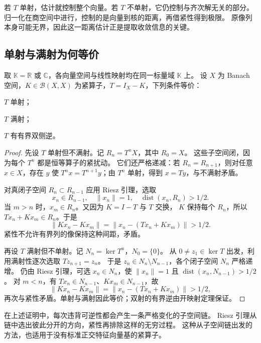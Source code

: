 若 \(T\) 单射，估计就控制整个向量。若 \(T\) 不单射，它仍控制与齐次解无关的部分。
归一化在商空间中进行，控制的是向量到核的距离，再借紧性得到极限。
原像列本身可能无界，因此这一距离估计正是提取收敛信息的关键。

\subsection{单射与满射为何等价}
\label{b1:subsec:C10402}

\begin{theorem}\label{b1:thm:C1-fredholm-bijective}
取 \(\mathbb K=\mathbb R\) 或 \(\mathbb C\)，各向量空间与线性映射均在同一标量域 \(\mathbb K\) 上。
设 \(X\) 为 Banach 空间，\(K\in\mathcal B(X,X)\) 为紧算子，\(T=I_X-K\)，下列条件等价：
\begin{equivalences}
\item\label{b1:item:C1-fredholm-injective}\(T\) 单射；
\item\label{b1:item:C1-fredholm-surjective}\(T\) 满射；
\item\label{b1:item:C1-fredholm-invertible}\(T\) 有有界双侧逆。
\end{equivalences}
\end{theorem}
\begin{proof}
先设 \(T\) 单射但不满射。记 \(R_n=T^nX\)，其中 \(R_0=X\)。
这些子空间闭，因为每个 \(T^n\) 都是恒等算子的紧扰动。
它们还严格递减：若 \(R_n=R_{n+1}\)，则对任意 \(x\in X\)，存在 \(y\) 使
\(T^nx=T^{n+1}y\)；由 \(T^n\) 单射，得到 \(x=Ty\)，与不满射矛盾。

对真闭子空间 \(R_n\subset R_{n-1}\) 应用 Riesz 引理，选取
\[
 x_n\in R_{n-1},\quad\|x_n\|=1,\quad\operatorname{dist}(x_n,R_n)>1/2.
\]
当 \(m>n\) 时，\(x_m\in R_n\)。又因为 \(K=I-T\) 与 \(T\) 交换，
\(K\) 保持每个 \(R_n\)，所以 \(Tx_n+Kx_m\in R_n\)。于是
\[
 \|Kx_n-Kx_m\|=\|x_n-(Tx_n+Kx_m)\|>1/2.
\]
紧性不允许有界列的像保持这种间距，矛盾。

再设 \(T\) 满射但不单射。记 \(N_n=\ker T^n\)，\(N_0=\{0\}\)。
从 \(0\ne z_1\in\ker T\) 出发，利用满射性逐次选取 \(Tz_{n+1}=z_n\)。
于是 \(z_n\in N_n\setminus N_{n-1}\)，各个闭子空间 \(N_n\) 严格递增。
仍由 Riesz 引理，可选 \(x_n\in N_n\)，使
\(\|x_n\|=1\) 且 \(\operatorname{dist}(x_n,N_{n-1})>1/2\)。
对 \(m<n\)，有 \(Tx_n\in N_{n-1}\)、\(Kx_m\in N_{n-1}\)，故
\[
 \|Kx_n-Kx_m\|=\|x_n-(Tx_n+Kx_m)\|>1/2,
\]
再次与紧性矛盾。单射与满射因此等价；双射的有界逆由开映射定理保证。
\end{proof}

在上述证明中，每次违背可逆性都会产生一条严格变化的子空间链。
Riesz 引理从链中选出彼此分开的方向，紧性再排除这样的无穷过程。
这种从子空间链出发的方法，也适用于没有标准正交特征向量基的紧算子。

